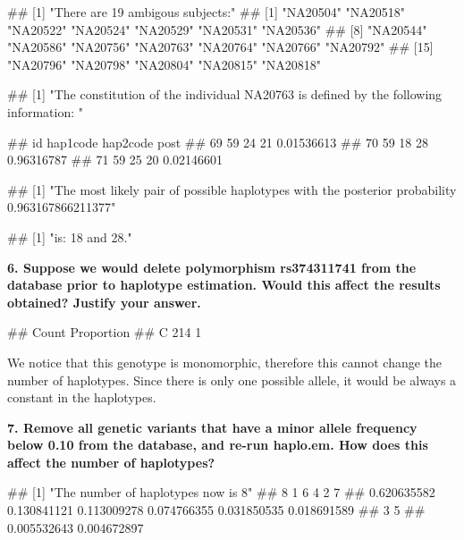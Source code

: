\documentclass[]{article}
\newenvironment{Shaded}{\begin{snugshade}}{\end{snugshade}}
\newcommand{\NormalTok}[1]{#1}
\begin{document}
\begin{Shaded}
\begin{Highlighting}[]
\NormalTok{## [1] "There are 19 ambigous subjects:"}
\NormalTok{## [1] "NA20504" "NA20518" "NA20522" "NA20524" "NA20529" "NA20531" "NA20536"}
\NormalTok{## [8] "NA20544" "NA20586" "NA20756" "NA20763" "NA20764" "NA20766" "NA20792"}
\NormalTok{## [15] "NA20796" "NA20798" "NA20804" "NA20815" "NA20818"}

\NormalTok{## [1] "The constitution of the individual NA20763 is defined by the following information: "}

\NormalTok{## id hap1code hap2code post}
\NormalTok{## 69 59    24      21  0.01536613}
\NormalTok{## 70 59    18      28  0.96316787}
\NormalTok{## 71 59    25      20  0.02146601}

\NormalTok{## [1] "The most likely pair of possible haplotypes with the posterior probability 0.963167866211377"}

\NormalTok{## [1] "is: 18 and 28."}
\end{Highlighting}
\end{Shaded}

\textbf{6. Suppose we would delete polymorphism rs374311741 from the
database prior to haplotype estimation. Would this affect the results
obtained? Justify your answer.}

\begin{Shaded}
\begin{Highlighting}[]
\NormalTok{##   Count Proportion}
\NormalTok{## C 214   1}
\end{Highlighting}
\end{Shaded}

We notice that this genotype is monomorphic, therefore this cannot
change the number of haplotypes. Since there is only one possible
allele, it would be always a constant in the haplotypes.

\textbf{7. Remove all genetic variants that have a minor allele
frequency below 0.10 from the database, and re-run haplo.em. How does
this affect the number of haplotypes?}

\begin{Shaded}
\begin{Highlighting}[]
\NormalTok{## [1] "The number of haplotypes now is 8"}
\NormalTok{## 8           1           6           4           2           7}
\NormalTok{## 0.620635582 0.130841121 0.113009278 0.074766355 0.031850535 0.018691589}
\NormalTok{## 3           5}
\NormalTok{## 0.005532643 0.004672897}
\end{Highlighting}
\end{Shaded}
\end{document}
